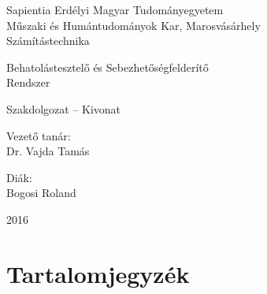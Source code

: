 
\newpage
\pagestyle{empty}

	\begin{center}
		{\Large Sapientia Erdélyi Magyar Tudományegyetem}\\\vspace{0.05in}
		{\Large Műszaki és Humántudományok Kar, Marosvásárhely}\\\vspace{0.07in}
		{\Large Számítástechnika}\\
		
		\vspace{2.5in}
		
		{\huge Behatolástesztelő és Sebezhetőségfelderítő}\\\vspace{0.1in}
		{\huge Rendszer}
		
		\vspace{0.5in}
		
		{\LARGE Szakdolgozat -- Kivonat}
		
	\end{center}
	
	\vspace{2.0in}
	
	\begin{multicols}{2}
		\begin{flushleft}
			{\Large Vezető tanár:}\\\vspace{0.1in}
			{\LARGE {Dr. Vajda Tamás}}
		\end{flushleft}
		\columnbreak
		\begin{flushright}
			{\Large Diák:}\\\vspace{0.1in}
			{\LARGE {Bogosi Roland}}
		\end{flushright}
	\end{multicols}
	
	\vspace{1.5in}
		
	\begin{center}
		{\LARGE 2016}
	\end{center}

\newpage
\section*{Tartalomjegyzék}

	\begingroup
	\renewcommand{\section}[2]{}
	\hypersetup{linkcolor=lightblue}
	\setlength{\parskip}{0em}
	\hungariantableofcontents
	\endgroup

